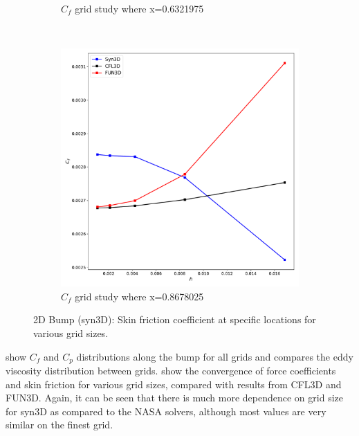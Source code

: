 \begin{figure}[ht!]
\begin{subfigure}{.45\textwidth}
  \caption{$C_f$ grid study where x=0.6321975}
\end{subfigure}
\\
\begin{subfigure}{.45\textwidth}
  \centering
  \includegraphics[width=1.0\textwidth]{figs/2dbump/Cf08678025GridStudy.pdf}
  \caption{$C_f$ grid study where x=0.8678025}
\end{subfigure}%
\caption{2D Bump (syn3D): Skin friction coefficient at specific locations for various grid sizes.}
\label{fig:syn2dbumpcflocstudy}
\end{figure}

 show $C_f$ and $C_p$ distributions along the bump for all grids and  compares the eddy viscosity distribution between grids.  show the convergence of force coefficients and skin friction for various grid sizes, compared with results from CFL3D and FUN3D. Again, it can be seen that there is much more dependence on grid size for syn3D as compared to the NASA solvers, although most values are very similar on the finest grid.
